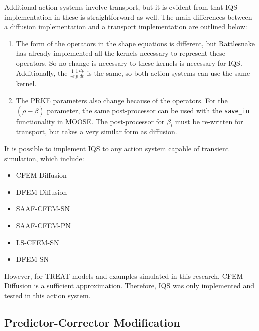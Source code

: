 Additional action systems involve transport, but it is evident from  that IQS implementation in these is straightforward as well.  The main differences between a diffusion implementation and a transport implementation are outlined below:

\begin{enumerate}
\item The form of the operators in the shape equations is different, but Rattlesnake has already implemented all the kernels necessary to represent these operators.  So no change is necessary to these kernels is necessary for IQS.  Additionally, the $\frac{1}{v^g}\frac{1}{p}\frac{dp}{dt}$ is the same, so both action systems can use the same kernel.
\item The PRKE parameters also change because of the operators.  For the $(\rho-\bar{\beta})$ parameter, the same post-processor can be used with the \texttt{save\_in} functionality in MOOSE.  The post-processor for $\bar{\beta}_i$ must be re-written for transport, but takes a very similar form as diffusion.
\end{enumerate}

It is possible to implement IQS to any action system capable of transient simulation, which include:
\begin{itemize}
\item CFEM-Diffusion
\item DFEM-Diffusion
\item SAAF-CFEM-SN
\item SAAF-CFEM-PN
\item LS-CFEM-SN
\item DFEM-SN
\end{itemize}
However, for TREAT models and examples simulated in this research, CFEM-Diffusion is a sufficient approximation. Therefore, IQS was only implemented and tested in this action system.

\subsection{Predictor-Corrector Modification}

